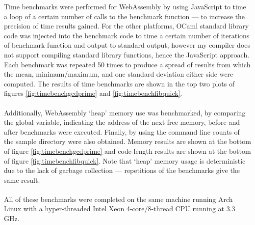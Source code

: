 Time benchmarks were performed for WebAssembly by using JavaScript to time a loop of a certain number of calls to the benchmark function --- to increase the precision of time results gained. For the other platforms, OCaml standard library code was injected into the benchmark code to time a certain number of iterations of benchmark function and output to standard output, however my compiler does not support compiling standard library functions, hence the JavaScript approach. Each benchmark was repeated 50 times to produce a spread of results from which the mean, minimum/maximum, and one standard deviation either side were computed. The results of time benchmarks are shown in the top two plots of figures \ref{fig:timebenchgcdprime} and \ref{fig:timebenchfibquick}.
\\\\
Additionally, WebAssembly `heap' memory use was benchmarked, by comparing the  global variable, indicating the address of the next free memory, before and after benchmarks were executed. Finally, by using the  command line counts of the sample directory were also obtained. Memory results are shown at the bottom of figure \ref{fig:timebenchgcdprime} and code-length results are shown at the bottom of figure \ref{fig:timebenchfibquick}. Note that `heap' memory usage is deterministic due to the lack of garbage collection --- repetitions of the benchmarks give the same result.
\\\\
All of these benchmarks were completed on the same machine running Arch Linux with a hyper-threaded Intel Xeon 4-core/8-thread CPU running at 3.3 GHz.
